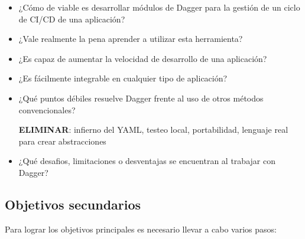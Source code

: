 \begin{itemize}
  \item ¿Cómo de viable es desarrollar módulos de Dagger para la gestión de un ciclo de CI/CD de una aplicación?
  \item ¿Vale realmente la pena aprender a utilizar esta herramienta?
  \item ¿Es capaz de aumentar la velocidad de desarrollo de una aplicación?
  \item ¿Es fácilmente integrable en cualquier tipo de aplicación?
  \item ¿Qué puntos débiles resuelve Dagger frente al uso de otros métodos convencionales?

    \textbf{ELIMINAR}: infierno del YAML, testeo local, portabilidad, lenguaje real para crear abstracciones
  \item ¿Qué desafios, limitaciones o desventajas se encuentran al trabajar con Dagger?
\end{itemize}

\subsection*{Objetivos secundarios}

Para lograr los objetivos principales es necesario llevar a cabo varios pasos:

